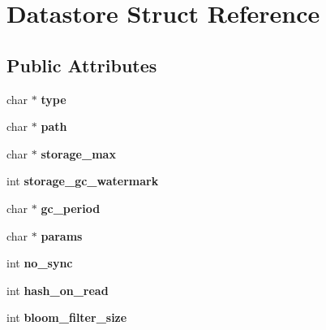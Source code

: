 \hypertarget{struct_datastore}{}\section{Datastore Struct Reference}
\label{struct_datastore}
\subsection*{Public Attributes}
\begin{DoxyCompactItemize}
\item 
\mbox{\label{struct_datastore_a0bc5b33e9f9c7b1ab9d33281343d9673}} 
char $\ast$ {\bfseries type}
\item 
\mbox{\label{struct_datastore_a5546a42b23436bcec489c61e2381a214}} 
char $\ast$ {\bfseries path}
\item 
\mbox{\label{struct_datastore_a969cc26c406560f8f93f271a21e41ffb}} 
char $\ast$ {\bfseries storage\+\_\+max}
\item 
\mbox{\label{struct_datastore_ad30e7e129679882e754481926cad5baf}} 
int {\bfseries storage\+\_\+gc\+\_\+watermark}
\item 
\mbox{\label{struct_datastore_ae075a1de3ce1d104388f62af2541ef3f}} 
char $\ast$ {\bfseries gc\+\_\+period}
\item 
\mbox{\label{struct_datastore_ab12d574ba5337bd9e0c0d722eca5172c}} 
char $\ast$ {\bfseries params}
\item 
\mbox{\label{struct_datastore_a9670ea454e69331eadbaab27115c0b49}} 
int {\bfseries no\+\_\+sync}
\item 
\mbox{\label{struct_datastore_af07c22516e28e9114657e5c79978a22d}} 
int {\bfseries hash\+\_\+on\+\_\+read}
\item 
\mbox{\label{struct_datastore_ac4509ea219f6ddc01d00dae68f34377e}} 
int {\bfseries bloom\+\_\+filter\+\_\+size}
\item 
\mbox{\label{struct_datastore_a755167150bf4ad7def26de9104a4712c}} 

\end{DoxyCompactItemize}
